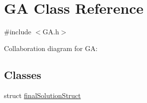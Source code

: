 \hypertarget{class_g_a}{}\section{GA Class Reference}
\label{class_g_a}


{\ttfamily \#include $<$G\+A.\+h$>$}



Collaboration diagram for GA\+:
\subsection*{Classes}
\begin{DoxyCompactItemize}
\item 
struct \hyperlink{struct_g_a_1_1final_solution_struct}{final\+Solution\+Struct}
\end{DoxyCompactItemize}
